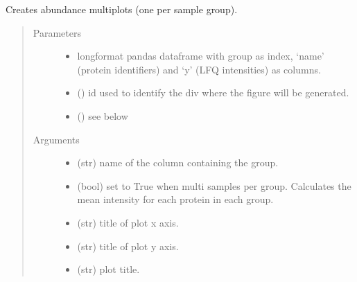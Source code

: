 \documentclass[letterpaper,10pt,english]{sphinxmanual}
\begin{document}
\begin{fulllineitems}
\label{\detokenize{_autosummary/analytics_core.viz:analytics_core.viz.viz.get_ranking_plot}}
Creates abundance multiplots (one per sample group).
\begin{quote}\begin{description}
\item[{Parameters}] \leavevmode\begin{itemize}
\item {} 
 \textendash{} long\sphinxhyphen{}format pandas dataframe with group as index, ‘name’ (protein identifiers) and ‘y’ (LFQ intensities) as columns.

\item {} 
 () \textendash{} id used to identify the div where the figure will be generated.

\item {} 
 () \textendash{} see below

\end{itemize}

\item[{Arguments}] \leavevmode\begin{itemize}
\item {} 
 (str) \textendash{} name of the column containing the group.

\item {} 
 (bool) \textendash{} set to True when multi samples per group. Calculates the mean intensity for each protein in each group.

\item {} 
 (str) \textendash{} title of plot x axis.

\item {} 
 (str) \textendash{} title of plot y axis.

\item {} 
 (str) \textendash{} plot title.


\end{itemize}
\end{description}
\end{quote}
\end{fulllineitems}
\end{document}
